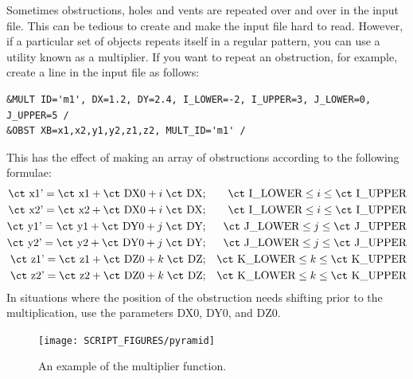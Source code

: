 \documentclass[11pt]{book}
\begin{document}
Sometimes obstructions, holes and vents are repeated over and over in the input file. This can be tedious to create and make the input file hard to read. However, if a particular set of objects repeats itself in a regular pattern, you can use a utility known as a multiplier. If you want to repeat an obstruction, for example, create a line in the input file as follows:
 \begin{lstlisting}
&MULT ID='m1', DX=1.2, DY=2.4, I_LOWER=-2, I_UPPER=3, J_LOWER=0, J_UPPER=5 /
&OBST XB=x1,x2,y1,y2,z1,z2, MULT_ID='m1' /
\end{lstlisting}
This has the effect of making an array of obstructions according to the following formulae:
\begin{eqnarray*}  \hbox{\ct x1'} = \hbox{\ct x1} + \hbox{\ct DX0} + i \; \hbox{\ct DX}  &;& \hbox{\ct I\_LOWER} \le i \le \hbox{\ct I\_UPPER} \\
                   \hbox{\ct x2'} = \hbox{\ct x2} + \hbox{\ct DX0} + i \; \hbox{\ct DX}  &;& \hbox{\ct I\_LOWER} \le i \le \hbox{\ct I\_UPPER} \\
                   \hbox{\ct y1'} = \hbox{\ct y1} + \hbox{\ct DY0} + j \; \hbox{\ct DY}  &;& \hbox{\ct J\_LOWER} \le j \le \hbox{\ct J\_UPPER} \\
                   \hbox{\ct y2'} = \hbox{\ct y2} + \hbox{\ct DY0} + j \; \hbox{\ct DY}  &;& \hbox{\ct J\_LOWER} \le j \le \hbox{\ct J\_UPPER} \\
                   \hbox{\ct z1'} = \hbox{\ct z1} + \hbox{\ct DZ0} + k \; \hbox{\ct DZ}  &;& \hbox{\ct K\_LOWER} \le k \le \hbox{\ct K\_UPPER} \\
                   \hbox{\ct z2'} = \hbox{\ct z2} + \hbox{\ct DZ0} + k \; \hbox{\ct DZ}  &;& \hbox{\ct K\_LOWER} \le k \le \hbox{\ct K\_UPPER}
\end{eqnarray*}
In situations where the position of the obstruction needs shifting prior to the multiplication, use the parameters {\ct DX0}, {\ct DY0}, and {\ct DZ0}.

\begin{figure}[t]
\texttt{[image: SCRIPT\_FIGURES/pyramid]}
\caption[An example of the multiplier function]{An example of the multiplier function.}
\label{fig:mult}
\end{figure}
\end{document}
